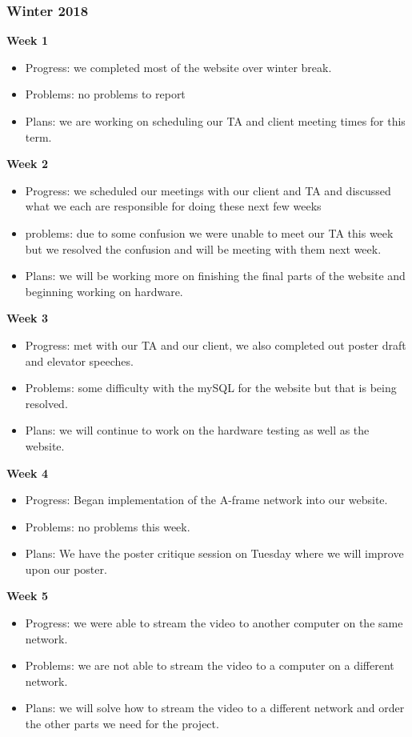 \documentclass[onecolumn, draftclsnofoot,10pt, compsoc]{IEEEtran}
\begin{document}
\subsubsection{Winter 2018}
\textbf{Week 1}
\begin{itemize}
    \item Progress: we completed most of the website over winter break.
    \item Problems: no problems to report
    \item Plans: we are working on scheduling our TA and client meeting times for this term.
\end{itemize}
\textbf{Week 2}
\begin{itemize}
    \item Progress: we scheduled our meetings with our client and TA and discussed what we each are responsible for doing these next few weeks
    \item problems: due to some confusion we were unable to meet our TA this week but we resolved the confusion and will be meeting with them next week.
    \item Plans: we will be working more on finishing the final parts of the website and beginning working on hardware.
\end{itemize}
\textbf{Week 3}
\begin{itemize}
    \item Progress: met with our TA and our client, we also completed out poster draft and elevator speeches.
    \item Problems: some difficulty with the mySQL for the website but that is being resolved.
    \item Plans: we will continue to work on the hardware testing as well as the website.
\end{itemize}
\textbf{Week 4}
\begin{itemize}
    \item Progress: Began implementation of the A-frame network into our website.
    \item Problems: no problems this week.
    \item Plans: We have the poster critique session on Tuesday where we will improve upon our poster.
\end{itemize}
\textbf{Week 5}
\begin{itemize}
    \item Progress: we were able to stream the video to another computer on the same network.
    \item Problems: we are not able to stream the video to a computer on a different network.
    \item Plans: we will solve how to stream the video to a different network and order the other parts we need for the project.
\end{itemize}
\end{document}
